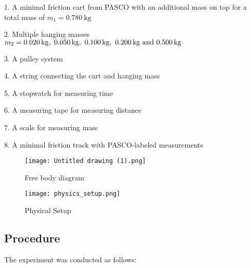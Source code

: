 ﻿\documentclass[reprint,amsmath,amssymb,aps]{revtex4-2}
\begin{document}
1. A minimal friction cart from PASCO with  an additional mass on top for a total mass of $m_1 = \qty{0.780}{\kilo\gram}$

2. Multiple hanging masses $m_2 = \qtylist{0.020;0.050;0.100;0.200;0.500}{\kilo\gram}$

3. A pulley system

4. A string connecting the cart and hanging mass

5. A stopwatch for measuring time

6. A measuring tape for measuring distance

7. A scale for measuring mass

8. A minimal friction track with PASCO-labeled measurements

\begin{figure}
\begin{center}
\texttt{[image: Untitled drawing (1).png]}
\end{center}
\caption{\label{fig:freebody} Free body diagram}
\end{figure}

\begin{figure}
\begin{center}
\texttt{[image: physics\_setup.png]}
\end{center}
\caption{\label{fig:setup} Physical Setup}
\end{figure}




\subsection{Procedure}

The experiment was conducted as follows:
\end{document}
